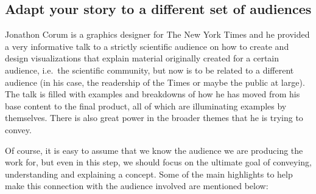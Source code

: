 \documentclass[]{book}
\begin{document}
\hypertarget{adapt-your-story-to-a-different-set-of-audiences}{%
\subsection{Adapt your story to a different set of audiences}\label{adapt-your-story-to-a-different-set-of-audiences}}

Jonathon Corum is a graphics designer for The New York Times and he provided a very informative talk to a strictly scientific audience on how to create and design visualizations that explain material originally created for a certain audience, i.e.~the scientific community, but now is to be related to a different audience (in his case, the readership of the Times or maybe the public at large). The talk is filled with examples and breakdowns of how he has moved from his base content to the final product, all of which are illuminating examples by themselves. There is also great power in the broader themes that he is trying to convey.

Of course, it is easy to assume that we know the audience we are producing the work for, but even in this step, we should focus on the ultimate goal of conveying, understanding and explaining a concept. Some of the main highlights to help make this connection with the audience involved are mentioned below:
\end{document}

